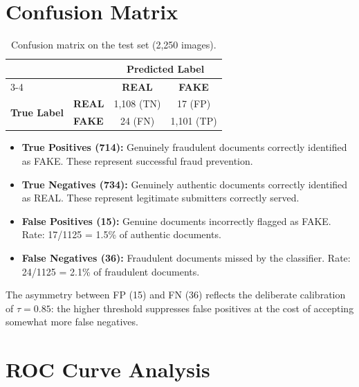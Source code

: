 \documentclass[12pt,a4paper,oneside]{report}
\begin{document}
\section{Confusion Matrix}
\label{sec:confusion_ch4}

\begin{table}[H]
\centering
\caption{Confusion matrix on the test set (2,250 images).}
\label{tab:cm}
\renewcommand{\arraystretch}{1.5}
\begin{tabular}{llcc}
\toprule
& & \multicolumn{2}{c}{\textbf{Predicted Label}} \\
\cmidrule(lr){3-4}
& & \textbf{REAL} & \textbf{FAKE} \\
\midrule
\multirow{2}{*}{\textbf{True Label}} & \textbf{REAL} & 1,108 (TN) & 17 (FP) \\
                                      & \textbf{FAKE} & 24 (FN)  & 1,101 (TP) \\
\bottomrule
\end{tabular}
\end{table}

\begin{itemize}
\item \textbf{True Positives (714):} Genuinely fraudulent documents correctly
identified as FAKE. These represent successful fraud prevention.
\item \textbf{True Negatives (734):} Genuinely authentic documents correctly
identified as REAL. These represent legitimate submitters correctly served.
\item \textbf{False Positives (15):} Genuine documents incorrectly flagged as
FAKE. Rate: 17/1125 = 1.5\% of authentic documents.
\item \textbf{False Negatives (36):} Fraudulent documents missed by the classifier.
Rate: 24/1125 = 2.1\% of fraudulent documents.
\end{itemize}

The asymmetry between FP (15) and FN (36) reflects the deliberate calibration
of $\tau=0.85$: the higher threshold suppresses false positives at the cost of
accepting somewhat more false negatives.

\section{ROC Curve Analysis}
\label{sec:roc}
\end{document}
